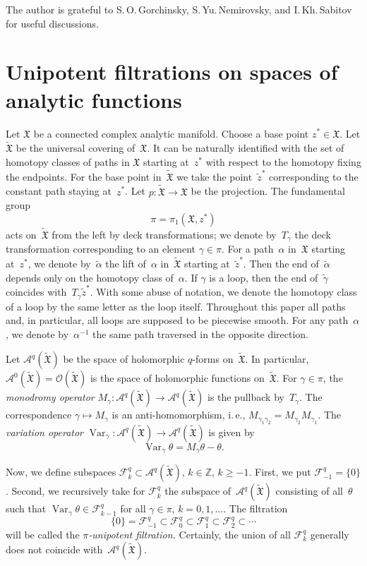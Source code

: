 \documentclass[reqno,tbtags,12pt]{amsart}
\numberwithin{equation}{section}
\newcommand{\Z}{\mathbb{Z}}
\newcommand{\FX}{\mathfrak{X}}
\newcommand{\tFX}{\widetilde{\mathfrak{X}}}
\newcommand{\CF}{\mathcal{F}}
\newcommand{\CO}{\mathcal{O}}
\newcommand{\A}{\mathcal{A}}
\newcommand{\tz}{\tilde{z}}
\newcommand{\Var}{\mathop{\mathrm{Var}}\nolimits}
\theoremstyle{definition}
\begin{document}
The author is grateful to S.\,O.\,Gorchinsky, S.\,Yu.\,Nemirovsky, and I.\,Kh.\,Sabitov for useful discussions.



\section{Unipotent filtrations on spaces of analytic functions}\label{section_fh}



Let $\FX$ be a connected complex analytic manifold. Choose a base point $z^*\in\FX$. Let $\tFX$ be the universal covering of~$\FX$. It can be naturally identified with the set of homotopy classes of paths in $\FX$ starting at~$z^*$ with respect to the homotopy fixing the endpoints. For the base point in~$\tFX$ we take the point~$\tz^*$ corresponding to the constant path staying at~$z^*$. Let $p\colon\tFX\to \FX$ be the projection. The fundamental group 
$$
\pi=\pi_1(\FX,z^*)
$$ 
acts on~$\tFX$ from the left by deck transformations; we denote by~$T_{\gamma}$ the deck transformation corresponding to an element $\gamma\in\pi$.  For a path~$\alpha$ in~$\FX$ starting at~$z^*$, we denote by~$\tilde\alpha$ the lift of~$\alpha$ in~$\tFX$ starting at~$\tz^*$. Then the end of~$\tilde\alpha$  depends only on the homotopy class of~$\alpha$. If $\gamma$ is a loop, then the end of~$\tilde\gamma$ coincides with~$T_{\gamma}\tz^*$. With some abuse of notation, we denote the homotopy class of a loop by the same letter as the loop itself. Throughout this paper all paths and, in particular, all loops  are supposed to be piecewise smooth. For any path~$\alpha$, we denote by~$\alpha^{-1}$ the same path traversed in the opposite direction.


Let $\A^q(\tFX)$ be the space of holomorphic $q$-forms on~$\tFX$. In particular, $\A^0(\tFX)=\CO(\tFX)$ is the space of holomorphic functions on~$\tFX$. For $\gamma\in\pi$, the \textit{monodromy operator\/} $M_{\gamma}\colon\A^q(\tFX)\to\A^q(\tFX)$ is the pullback by~$T_{\gamma}$. The correspondence $\gamma\mapsto M_{\gamma}$ is an anti-homomorphism, i.\,e., $M_{\gamma_1\gamma_2}=M_{\gamma_2}M_{\gamma_1}$. The  \textit{variation operator\/}  $\Var_{\gamma}\colon\A^q(\tFX)\to\A^q(\tFX)$ is given by
\begin{equation*}
\Var_{\gamma}\theta=M_{\gamma}\theta-\theta.
\end{equation*}

Now, we define subspaces $\CF_k^q\subset\A^q(\tFX)$, $k\in\Z$, $k\ge -1$. First, we put $\CF_{-1}^q=\{0\}$. Second, we recursively take for $\CF_k^{q}$ the subspace of~$\A^q(\tFX)$ consisting of all~$\theta$ such that $\Var_{\gamma}\theta\in \CF_{k-1}^q$ for all $\gamma\in\pi$, $k=0,1,\ldots$. The filtration 
$$
\{0\}=\CF_{-1}^q\subset\CF_0^q\subset\CF_1^q\subset\CF_2^q\subset\cdots
$$
will be called the \textit{$\pi$-unipotent filtration.} Certainly, the union of all  $\CF_k^q$ generally does not coincide with~$\A^q(\tFX)$.
\end{document}
